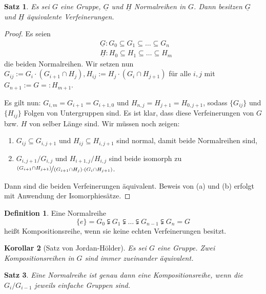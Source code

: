 \documentclass[12pt]{scrartcl} %
\newtheorem{thm}{Satz}[section]
\newtheorem{kor}[thm]{Korollar}
\theoremstyle{definition}
\newtheorem*{defn}{Definition}
\theoremstyle{remark}
\begin{document}
\begin{thm}
Es sei $G$ eine Gruppe, $\underline{G}$ und $\underline{H}$ Normalreihen in $G$. Dann besitzen $\underline{G}$ und $\underline{H}$ äquivalente Verfeinerungen.
\end{thm}

\begin{proof}
	Es seien 
	\[\begin{split}
			&\underline{G}: G_0\subseteq G_1 \subseteq\dots\subseteq G_n \\
			&\underline{H}: H_0\subseteq H_1\subseteq\dots\subseteq H_m 
		\end{split}\]
	die beiden Normalreihen. Wir setzen nun $G_{ij}:=G_i\cdot(G_{i+1}\cap H_j), H_{ij} := H_j\cdot(G_i\cap H_{j+1})$ für alle $i,j$ mit $G_{n+1}:=G=:H_{m+1}$.
	
	Es gilt nun: $G_{i,m}=G_{i+1}=G_{i+1,0}$ und $H_{n,j}=H_{j+1}=H_{0,j+1}$, sodass $\{G_{ij}\}$ und $\{H_{ij}\}$ Folgen von Untergruppen sind. Es ist klar, dass diese Verfeinerungen von $G$ bzw. $H$ von selber Länge sind. Wir müssen noch zeigen:
	\begin{enumerate}[label=(\alph*)]
		\item $G_{ij}\subseteq G_{i,j+1}$ und $H_{ij}\subseteq H_{i,j+1}$ sind normal, damit beide Normalreihen sind,
		\item $G_{i,j+1}/G_{i,j}$ und $H_{i+1,j}/H_{i,j}$ sind beide isomorph zu $\nicefrac{(G_{i+1}\cap H_{j+1})}{(G_{i+1}\cap H_{j})\cdot(G_{i}\cap H_{j+1})}$.
	\end{enumerate}
	Dann sind die beiden Verfeinerungen äquivalent. Beweis von (a) und (b) erfolgt mit Anwendung der Isomorphiesätze.
\end{proof}

\begin{defn}
	Eine Normalreihe 
		\[\{e\}=G_0\subsetneqq G_1 \subsetneqq\dots\subsetneqq G_{n-1}\subsetneqq G_n=G \]
	heißt Kompositionsreihe, wenn sie keine echten Verfeinerungen besitzt.
\end{defn}

\begin{kor}[Satz von Jordan-Hölder]
	Es sei $G$ eine Gruppe. Zwei Kompositionsreihen in $G$ sind immer zueinander äquivalent.
\end{kor}

\begin{thm}
	Eine Normalreihe ist genau dann eine Kompositionsreihe, wenn die $G_i/G_{i-1}$ jeweils einfache Gruppen sind.
\end{thm}
\end{document}
